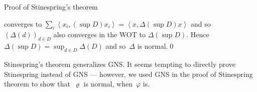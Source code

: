 \documentclass[b]{subfiles}
\begin{document}
\begin{parsec}
\begin{point}
\begin{point}{Proof of Stinespring's theorem }
\begin{point}
        converges to
        $ \sum_i \left<x_i,  (\sup D )x_i \right>
            = \left<x,  \Delta(\sup D )x \right>$
    and so~$(\Delta(d))_{d \in D}$
    also converges in the WOT to $\Delta(\sup D)$.
    Hence~$\Delta(\sup D) = \sup_{d \in D} \Delta(D)$
        and so~$\Delta$ is normal.\qed
\end{point}
\end{point}
\begin{point}%
Stinespring's theorem generalizes GNS.
It seems tempting to directly prove Stinespring instead of GNS ---
however, we used GNS in the proof of Stinespring theorem to show
that~$\varrho$ is normal, when~$\varphi$ is.
\end{point}
\end{point}
\end{parsec}
\end{document}
